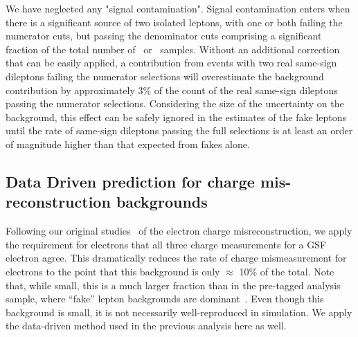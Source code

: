 We have neglected any "signal contamination". 
Signal contamination enters when there is a significant
source of two isolated leptons, with one or both failing the numerator cuts, but passing the denominator cuts
comprising  a significant fraction of the total number of \nNoNu\ or \nNoNo\ samples. 
Without an additional correction that can be easily applied,
a contribution from events with two real same-sign dileptons failing the numerator selections
 will overestimate the background contribution by approximately 3\% of the count of
the real same-sign dileptons passing the numerator selections.
Considering the size of the uncertainty on the background,
this effect can be safely ignored in the estimates 
of the fake leptons until the rate of same-sign dileptons passing the full
selections is at least an order of magnitude  higher than that expected
from fakes alone.


\subsection{Data Driven prediction for charge mis-reconstruction backgrounds}
\label{sec:flips}


Following our original studies~\cite{sspaper2010} of the electron charge misreconstruction, 
we apply the requirement for electrons that all three charge measurements for a GSF electron agree. 
This dramatically reduces the rate of charge mismeasurement for electrons to
the point that this background is only $\approx$ 10\% of the total.  Note 
that, while small, this is a much larger fraction than in
the pre-tagged analysis sample, where ``fake'' lepton backgrounds are
dominant~\cite{sspaper2010,sspaper2011,ssnote2011}.
Even though this background is small, it is not necessarily 
well-reproduced in simulation.
We apply the data-driven method used in the previous 
analysis\cite{sspaper2010,sspaper2011,ssnote2011}
here
as well.

